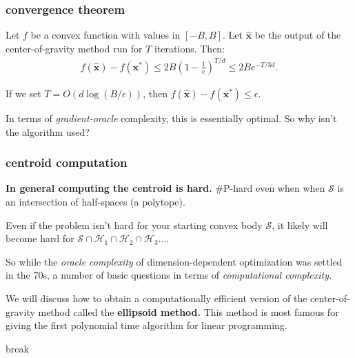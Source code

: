 \documentclass[compress]{beamer}
\newcommand{\bv}[1]{\mathbf{#1}}
\begin{document}
\begin{frame}[t]
	\frametitle{convergence theorem}
	\begin{theorem}
		Let $f$ be a convex function with values in $[-B,B]$.
		Let $\hat{\bv{x}}$ be the output of the center-of-gravity method run for $T$ iterations. Then:
		\begin{align*}
			f(\hat{\bv{x}}) - f(\bv{x}^*) \leq 2B \left(1-\frac{1}{e}\right)^{T/d} \leq 2B e^{-T/3d}.
		\end{align*}
	\end{theorem}
	If we set $T = O\left(d\log(B/\epsilon)\right)$, then $f(\hat{\bv{x}}) - f(\bv{x}^*) \leq \epsilon$. 

In terms of \emph{gradient-oracle} complexity, this is essentially optimal. So why isn't the algorithm used?
\end{frame}


\begin{frame}[t]
		\frametitle{centroid computation}
		\textbf{In general computing the centroid is hard.} \#P-hard even when when $\mathcal{S}$ is an intersection of half-spaces (a polytope).
		
		Even if the problem isn't hard for your starting convex body $\mathcal{S}$, it likely will become hard for $\mathcal{S} \cap \mathcal{H}_1  \cap \mathcal{H}_2 \cap \mathcal{H}_3 \ldots$. 
		
		So while the \emph{oracle complexity} of dimension-dependent optimization was settled in the 70s, a number of basic questions in terms of \emph{computational complexity.}

		\vspace{1em}
		We will discuss how to obtain a computationally efficient version of the center-of-gravity method called the \textbf{ellipsoid method.} This method is most famous for giving the first polynomial time algorithm for linear programming. 
\end{frame}

\begin{frame}[standout]
	\begin{center}
		\large break
	\end{center}
\end{frame}
\end{document}
